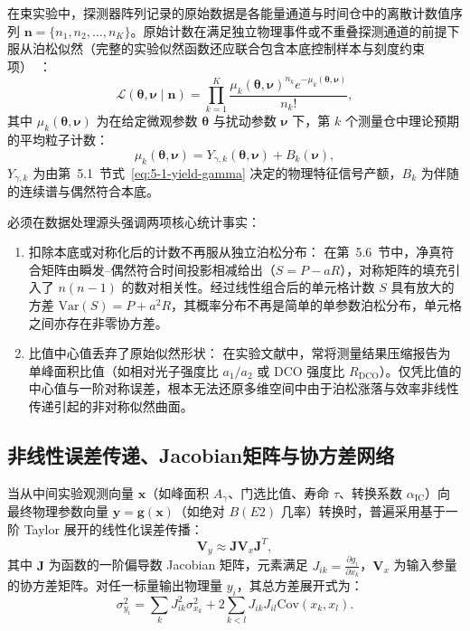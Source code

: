 在束实验中，探测器阵列记录的原始数据是各能量通道与时间仓中的离散计数值序列 $\mathbf{n} = \{n_1, n_2, \dots, n_K\}$。原始计数在满足独立物理事件或不重叠探测通道的前提下服从泊松似然（完整的实验似然函数还应联合包含本底控制样本与刻度约束项）~\cite{book-zhu-experimental-statistics, book-behnke-data-analysis}：
\begin{equation}\label{eq:5-10-poisson-likelihood}
\mathcal{L}(\boldsymbol{\theta}, \boldsymbol{\nu} \mid \mathbf{n}) = \prod_{k=1}^K \frac{\mu_k(\boldsymbol{\theta}, \boldsymbol{\nu})^{n_k} e^{-\mu_k(\boldsymbol{\theta}, \boldsymbol{\nu})}}{n_k!},
\end{equation}
其中 $\mu_k(\boldsymbol{\theta}, \boldsymbol{\nu})$ 为在给定微观参数 $\boldsymbol{\theta}$ 与扰动参数 $\boldsymbol{\nu}$ 下，第 $k$ 个测量仓中理论预期的平均粒子计数：
\begin{equation}\label{eq:5-10-mu-expectation}
\mu_k(\boldsymbol{\theta}, \boldsymbol{\nu}) = Y_{\gamma, k}(\boldsymbol{\theta}, \boldsymbol{\nu}) + B_k(\boldsymbol{\nu}),
\end{equation}
$Y_{\gamma, k}$ 为由第~5.1~节式~\eqref{eq:5-1-yield-gamma} 决定的物理特征信号产额，$B_k$ 为伴随的连续谱与偶然符合本底。

必须在数据处理源头强调两项核心统计事实：
\begin{enumerate}
\item 扣除本底或对称化后的计数不再服从独立泊松分布：
在第~5.6~节中，净真符合矩阵由瞬发--偶然符合时间投影相减给出（$S = P - aR$），对称矩阵的填充引入了 $n(n-1)$ 的数对相关性。经过线性组合后的单元格计数 $S$ 具有放大的方差 $\mathrm{Var}(S) = P + a^2 R$，其概率分布不再是简单的单参数泊松分布，单元格之间亦存在非零协方差。
\item 比值中心值丢弃了原始似然形状：
在实验文献中，常将测量结果压缩报告为单峰面积比值（如相对光子强度比 $a_1/a_2$ 或 DCO 强度比 $R_{\mathrm{DCO}}$）。仅凭比值的中心值与一阶对称误差，根本无法还原多维空间中由于泊松涨落与效率非线性传递引起的非对称似然曲面。
\end{enumerate}

\subsection{非线性误差传递、Jacobian矩阵与协方差网络}\label{subsec:5-10-2}

当从中间实验观测向量 $\mathbf{x}$（如峰面积 $A_\gamma$、门选比值、寿命 $\tau$、转换系数 $\alpha_{\mathrm{IC}}$）向最终物理参数向量 $\mathbf{y} = \mathbf{g}(\mathbf{x})$（如绝对 $B(E2)$ 几率）转换时，普遍采用基于一阶 Taylor 展开的线性化误差传播：
\begin{equation}\label{eq:5-10-covariance-prop}
\mathbf{V}_y \approx \mathbf{J} \mathbf{V}_x \mathbf{J}^T,
\end{equation}
其中 $\mathbf{J}$ 为函数的一阶偏导数 Jacobian 矩阵，元素满足 $J_{ik} = \frac{\partial g_i}{\partial x_k}$，$\mathbf{V}_x$ 为输入参量的协方差矩阵。对任一标量输出物理量 $y_i$，其总方差展开式为：
\begin{equation}\label{eq:5-10-var-sum}
\sigma_{y_i}^2 = \sum_k J_{ik}^2 \sigma_{x_k}^2 + 2 \sum_{k < l} J_{ik} J_{il} \mathrm{Cov}(x_k, x_l).
\end{equation}

